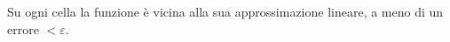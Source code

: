 \documentclass[preview]{standalone}
\begin{document}
\begin{center}
Su ogni cella la funzione è vicina alla sua approssimazione lineare, a meno di un errore $< \varepsilon$.
\end{center}
\end{document}
